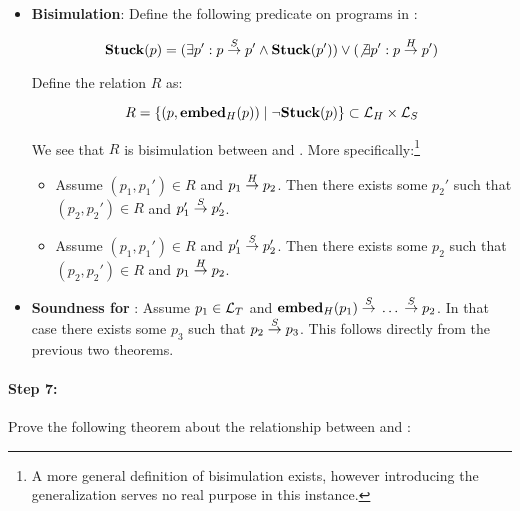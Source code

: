 \begin{itemize}
\item \textbf{Bisimulation}: Define the following predicate on
  programs in \highlang:

  $$\mathbf{Stuck}(p) = (\exists p': p {{}\stackrel{S}{->}{}} p' \land \mathbf{Stuck}(p')) \lor (\not\exists p': p {{}\stackrel{H}{->}{}} p')$$

  Define the relation $R$ as:

  $$R = \{(p, {{\mathbf{embed}}_H}(p)) \mid \neg\mathbf{Stuck}(p)\} \subset \mathcal{L}_H \times
  \mathcal{L}_S$$

  We see that $R$ is bisimulation between \higho{->} and \simpleo{->}. More
  specifically:\footnote{A more general definition of bisimulation exists,
    however introducing the generalization serves no real purpose in this
    instance.}
  \begin{itemize}
  \item Assume $(p_1, p_1') \in R$ and $p_1 {{}\stackrel{H}{->}{}} p_2$. Then there exists
    some $p_2'$ such that $(p_2, p_2') \in R$ and $p_1' {{}\stackrel{S}{->}{}} p_2'$.
  \item Assume $(p_1, p_1') \in R$ and $p_1' {{}\stackrel{S}{->}{}} p_2'$. Then there
    exists some $p_2$ such that $(p_2, p_2') \in R$ and
    $p_1 {{}\stackrel{H}{->}{}} p_2$.
  \end{itemize}
\item \textbf{Soundness for \simplelang}: Assume $p_1 \in \mathcal{L}_T$ and
  ${{\mathbf{embed}}_H}(p_1) {{}\stackrel{S}{->}{}} \dots {{}\ensuremath{\stackrel{S}{->}}{}} p_2$. In that case there
  exists some $p_3$ such that $p_2 {{}\stackrel{S}{->}{}} p_3$. This follows
  directly from the previous two theorems.
\end{itemize}

\paragraph{Step 7:} Prove the following theorem about the relationship between
\simplelang and \nativelang:

